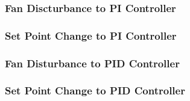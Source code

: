 \subsubsection{Fan Discturbance to PI Controller}
\begin{code}

\end{code}


\subsubsection{Set Point Change to PI Controller}
\begin{code}

\end{code}

\subsubsection{Fan Disturbance to PID Controller}
\begin{code}

\end{code}

\subsubsection{Set Point Change to PID Controller}
\begin{code}

\end{code}











